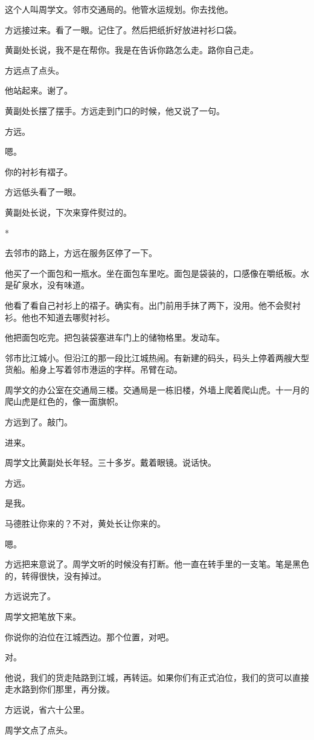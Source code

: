 \documentclass[UTF8,a5paper,11pt,openany]{ctexbook}
\newcommand{\scene}{\vspace{1em}\begin{center}*\quad*\quad*\end{center}\vspace{0.5em}}
\begin{document}
这个人叫周学文。邻市交通局的。他管水运规划。你去找他。

方远接过来。看了一眼。记住了。然后把纸折好放进衬衫口袋。

黄副处长说，我不是在帮你。我是在告诉你路怎么走。路你自己走。

方远点了点头。

他站起来。谢了。

黄副处长摆了摆手。方远走到门口的时候，他又说了一句。

方远。

嗯。

你的衬衫有褶子。

方远低头看了一眼。

黄副处长说，下次来穿件熨过的。


\scene

去邻市的路上，方远在服务区停了一下。

他买了一个面包和一瓶水。坐在面包车里吃。面包是袋装的，口感像在嚼纸板。水是矿泉水，没有味道。

他看了看自己衬衫上的褶子。确实有。出门前用手抹了两下，没用。他不会熨衬衫。他也不知道去哪熨衬衫。

他把面包吃完。把包装袋塞进车门上的储物格里。发动车。

邻市比江城小。但沿江的那一段比江城热闹。有新建的码头，码头上停着两艘大型货船。船身上写着邻市港运的字样。吊臂在动。

周学文的办公室在交通局三楼。交通局是一栋旧楼，外墙上爬着爬山虎。十一月的爬山虎是红色的，像一面旗帜。

方远到了。敲门。

进来。

周学文比黄副处长年轻。三十多岁。戴着眼镜。说话快。

方远。

是我。

马德胜让你来的？不对，黄处长让你来的。

嗯。

方远把来意说了。周学文听的时候没有打断。他一直在转手里的一支笔。笔是黑色的，转得很快，没有掉过。

方远说完了。

周学文把笔放下来。

你说你的泊位在江城西边。那个位置，对吧。

对。

他说，我们的货走陆路到江城，再转运。如果你们有正式泊位，我们的货可以直接走水路到你们那里，再分拨。

方远说，省六十公里。

周学文点了点头。
\end{document}
